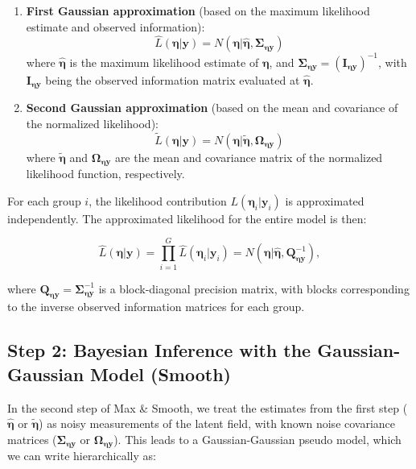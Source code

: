 \begin{enumerate}
    \item \textbf{First Gaussian approximation} (based on the maximum likelihood estimate and observed information):
    \begin{equation}
        \hat{L}(\boldsymbol{\eta}|\mathbf{y}) = N(\boldsymbol{\eta}|\hat{\boldsymbol{\eta}}, \mathbf{\Sigma}_{\boldsymbol{\eta}\mathbf{y}})
    \end{equation}
    where $\hat{\boldsymbol{\eta}}$ is the maximum likelihood estimate of $\boldsymbol{\eta}$, and $\mathbf{\Sigma}_{\boldsymbol{\eta}\mathbf{y}} = (\mathbf{I}_{\boldsymbol{\eta}\mathbf{y}})^{-1}$, with $\mathbf{I}_{\boldsymbol{\eta}\mathbf{y}}$ being the observed information matrix evaluated at $\hat{\boldsymbol{\eta}}$.

    \item \textbf{Second Gaussian approximation} (based on the mean and covariance of the normalized likelihood):
    \begin{equation}
        \tilde{L}(\boldsymbol{\eta}|\mathbf{y}) = N(\boldsymbol{\eta}|\tilde{\boldsymbol{\eta}}, \boldsymbol{\Omega}_{\boldsymbol{\eta}\mathbf{y}})
    \end{equation}
    where $\tilde{\boldsymbol{\eta}}$ and $\boldsymbol{\Omega}_{\boldsymbol{\eta}\mathbf{y}}$ are the mean and covariance matrix of the normalized likelihood function, respectively.
\end{enumerate}

For each group $i$, the likelihood contribution $L(\boldsymbol{\eta}_i|\mathbf{y}_i)$ is approximated independently. The approximated likelihood for the entire model is then:

\begin{equation}
    \hat{L}(\boldsymbol{\eta}|\mathbf{y}) = \prod_{i=1}^G \hat{L}(\boldsymbol{\eta}_i|\mathbf{y}_i) = N(\boldsymbol{\eta}|\hat{\boldsymbol{\eta}}, \mathbf{Q}_{\boldsymbol{\eta}\mathbf{y}}^{-1}),
\end{equation}

where $\mathbf{Q}_{\boldsymbol{\eta}\mathbf{y}} = \mathbf{\Sigma}_{\boldsymbol{\eta}\mathbf{y}}^{-1}$ is a block-diagonal precision matrix, with blocks corresponding to the inverse observed information matrices for each group.

\subsection{Step 2: Bayesian Inference with the Gaussian-Gaussian Model (Smooth)} \label{subsec:ms-step2}
In the second step of Max \& Smooth, we treat the estimates from the first step ($\hat{\boldsymbol{\eta}}$ or $\tilde{\boldsymbol{\eta}}$) as noisy measurements of the latent field, with known noise covariance matrices ($\mathbf{\Sigma}_{\boldsymbol{\eta}\mathbf{y}}$ or $\boldsymbol{\Omega}_{\boldsymbol{\eta}\mathbf{y}}$). This leads to a Gaussian-Gaussian pseudo model, which we can write hierarchically as:

